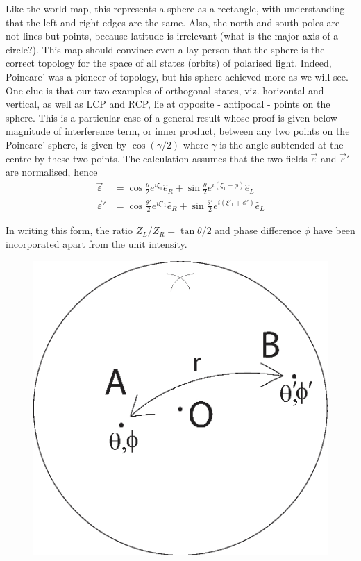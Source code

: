 Like the world map, this represents a sphere as a rectangle, with 
understanding that the left and right edges are the same. Also, the north and south poles
are not lines but points, because latitude is irrelevant (what is the major axis of
a circle?). This map should convince even a lay person that the sphere is the
correct topology for the space of all states (orbits) of polarised light. Indeed,
Poincare’ was a pioneer of topology, but his sphere achieved more as we will
see. One clue is that our two examples of orthogonal states, viz. horizontal and
vertical, as well as LCP and RCP, lie at opposite - antipodal - points on the
sphere. This is a particular case of a general result whose proof is given below
- magnitude of interference term, or inner product, between any two points on
the Poincare' sphere, is given by $\cos(\gamma/2)$ where $\gamma$ is the angle subtended at the
centre by these two points. The calculation assumes that the two fields $\overrightarrow{\varepsilon}$ and
$\overrightarrow{\varepsilon}'$ are normalised, hence
\begin{align*}
\overrightarrow{\varepsilon} & = \cos \frac{\theta}{2} e^{i \xi_1} \hat{e}_R + \sin \frac{\theta}{2} e^{i(\xi_1+ \phi)} \hat{e}_L\\
\overrightarrow{\varepsilon}' & = \cos \frac{\theta'}{2} e^{i \xi'_1} \hat{e}_R + \sin \frac{\theta'}{2} e^{i (\xi'_1 + \phi')} \hat{e}_L
\end{align*}

In writing this form, the ratio $Z_L /Z_R = \tan \theta/2$ and phase difference $\phi$ have
been incorporated apart from the unit intensity.
\bigskip

\begin{figure}[H]
\centering
\includegraphics[scale=0.21]{src/images/chap26/7.jpg}
\end{figure}
\bigskip

